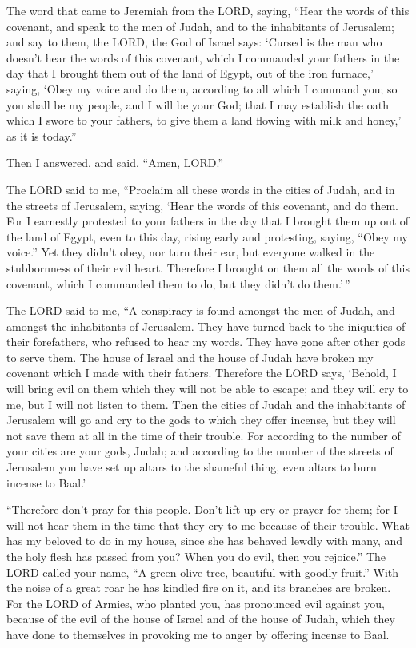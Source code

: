  The word that came to Jeremiah from the LORD, saying,
 ``Hear the words of this covenant, and speak to the men
of Judah, and to the inhabitants of Jerusalem;  and say to
them, the LORD, the God of Israel says: `Cursed is the man who doesn't
hear the words of this covenant,  which I commanded your
fathers in the day that I brought them out of the land of Egypt, out of
the iron furnace,' saying, `Obey my voice and do them, according to all
which I command you; so you shall be my people, and I will be your God;
 that I may establish the oath which I swore to your
fathers, to give them a land flowing with milk and honey,' as it is
today.''

Then I answered, and said, ``Amen, LORD.''

 The LORD said to me, ``Proclaim all these words in the
cities of Judah, and in the streets of Jerusalem, saying, `Hear the
words of this covenant, and do them.  For I earnestly
protested to your fathers in the day that I brought them up out of the
land of Egypt, even to this day, rising early and protesting, saying,
``Obey my voice.''  Yet they didn't obey, nor turn their
ear, but everyone walked in the stubbornness of their evil heart.
Therefore I brought on them all the words of this covenant, which I
commanded them to do, but they didn't do them.'\,''

 The LORD said to me, ``A conspiracy is found amongst the
men of Judah, and amongst the inhabitants of Jerusalem. 
They have turned back to the iniquities of their forefathers, who
refused to hear my words. They have gone after other gods to serve them.
The house of Israel and the house of Judah have broken my covenant which
I made with their fathers.  Therefore the LORD says,
`Behold, I will bring evil on them which they will not be able to
escape; and they will cry to me, but I will not listen to them.
 Then the cities of Judah and the inhabitants of
Jerusalem will go and cry to the gods to which they offer incense, but
they will not save them at all in the time of their trouble.
 For according to the number of your cities are your
gods, Judah; and according to the number of the streets of Jerusalem you
have set up altars to the shameful thing, even altars to burn incense to
Baal.'

 ``Therefore don't pray for this people. Don't lift up
cry or prayer for them; for I will not hear them in the time that they
cry to me because of their trouble.  What has my beloved
to do in my house, since she has behaved lewdly with many, and the holy
flesh has passed from you? When you do evil, then you rejoice.''
 The LORD called your name, ``A green olive tree,
beautiful with goodly fruit.'' With the noise of a great roar he has
kindled fire on it, and its branches are broken.  For the
LORD of Armies, who planted you, has pronounced evil against you,
because of the evil of the house of Israel and of the house of Judah,
which they have done to themselves in provoking me to anger by offering
incense to Baal.

